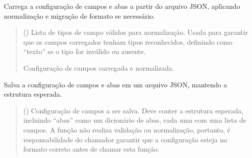 \documentclass[letterpaper,10pt,english]{sphinxmanual}
\begin{document}
\begin{fulllineitems}
\label{\detokenize{api/config:config.load_fields_config}}
\pysigstartsignatures
\pysiglinewithargsret
{}
{}
{}
\pysigstopsignatures
\sphinxAtStartPar
Carrega a configuração de campos e abas a partir do arquivo JSON, aplicando normalização e migração de formato se necessário.
\begin{quote}\begin{description}
\sphinxAtStartPar
{} () \textendash{} Lista de tipos de campo válidos para normalização. Usada para garantir que os campos carregados tenham tipos reconhecidos, definindo como “texto” se o tipo for inválido ou ausente.

\sphinxAtStartPar
Configuração de campos carregada e normalizada.

\sphinxAtStartPar
{}

\end{description}\end{quote}

\end{fulllineitems}


\begin{fulllineitems}
\label{\detokenize{api/config:config.save_fields_config}}
\pysigstartsignatures
\pysiglinewithargsret
{}
{}
{}
\pysigstopsignatures
\sphinxAtStartPar
Salva a configuração de campos e abas em um arquivo JSON, mantendo a estrutura esperada.
\begin{quote}\begin{description}
\sphinxAtStartPar
{} () \textendash{} Configuração de campos a ser salva. Deve conter a estrutura esperada, incluindo “abas” como um dicionário de abas, cada uma com uma lista de campos. A função não realiza validação ou normalização, portanto, é responsabilidade do chamador garantir que a configuração esteja no formato correto antes de chamar esta função.

\sphinxAtStartPar
{}

\end{description}\end{quote}

\end{fulllineitems}
\end{document}
